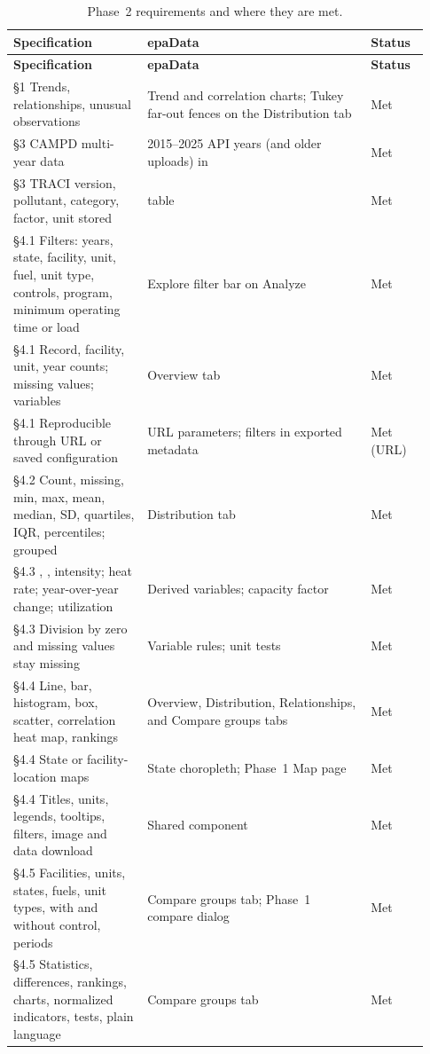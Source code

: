 \documentclass[11pt,a4paper]{article}
\begin{document}
{\small
\begin{longtable}{@{}R{0.3\linewidth}R{0.5\linewidth}R{0.13\linewidth}@{}}
\caption{Phase~2 requirements and where they are met.}\label{tab:trace}\\
\toprule
\textbf{Specification} & \textbf{epaData} & \textbf{Status}\\
\midrule\endfirsthead
\toprule
\textbf{Specification} & \textbf{epaData} & \textbf{Status}\\
\midrule\endhead
\S1 Trends, relationships, unusual observations & Trend and correlation charts; Tukey far-out fences on the Distribution tab & Met\\
\S3 CAMPD multi-year data & 2015--2025 API years (and older uploads) in  & Met\\
\S3 TRACI version, pollutant, category, factor, unit stored &  table & Met\\
\S4.1 Filters: years, state, facility, unit, fuel, unit type, controls, program, minimum operating time or load & Explore filter bar on Analyze & Met\\
\S4.1 Record, facility, unit, year counts; missing values; variables & Overview tab & Met\\
\S4.1 Reproducible through URL or saved configuration & URL parameters; filters in exported metadata & Met (URL)\\
\S4.2 Count, missing, min, max, mean, median, SD, quartiles, IQR, percentiles; grouped & Distribution tab & Met\\
\S4.3 \COtwo{}, \SOtwo{}, \NOx{} intensity; heat rate; year-over-year change; utilization & Derived variables; capacity factor & Met\\
\S4.3 Division by zero and missing values stay missing & Variable rules; unit tests & Met\\
\S4.4 Line, bar, histogram, box, scatter, correlation heat map, rankings & Overview, Distribution, Relationships, and Compare groups tabs & Met\\
\S4.4 State or facility-location maps & State choropleth; Phase~1 Map page & Met\\
\S4.4 Titles, units, legends, tooltips, filters, image and data download & Shared  component & Met\\
\S4.5 Facilities, units, states, fuels, unit types, with and without control, periods & Compare groups tab; Phase~1 compare dialog & Met\\
\S4.5 Statistics, differences, rankings, charts, normalized indicators, tests, plain language & Compare groups tab & Met\\

\end{longtable}}
\end{document}
